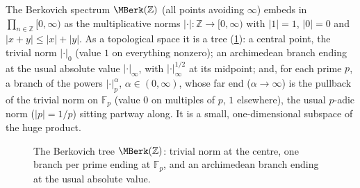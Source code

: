 \begin{remark}
\label{rmk:22:MZ}
The Berkovich spectrum $\MBerk(\mathbb Z)$ (all points avoiding $\infty$)
embeds in $\prod_{n\in\mathbb Z}[0,\infty)$ as the multiplicative norms
$|\cdot|\colon\mathbb Z\to[0,\infty)$ with $|1|=1$, $|0|=0$ and $|x+y|\le
|x|+|y|$. As a topological space it is a tree
(\cref{fig:22:MZ}): a central point, the trivial norm $|\cdot|_0$ (value $1$ on
everything nonzero); an archimedean branch ending at the usual absolute value
$|\cdot|_\infty$, with $|\cdot|_\infty^{1/2}$ at its midpoint; and, for each
prime $p$, a branch of the powers $|\cdot|_p^{\alpha}$, $\alpha\in(0,\infty)$,
whose far end ($\alpha\to\infty$) is the pullback of the trivial norm on
$\mathbb F_p$ (value $0$ on multiples of $p$, $1$ elsewhere), the usual
$p$-adic norm ($|p|=1/p$) sitting partway along. It is a small,
one-dimensional subspace of the huge product.
\end{remark}

\begin{figure}[ht]
\centering
{}
\caption{The Berkovich tree $\MBerk(\mathbb Z)$: trivial norm at the centre, one
branch per prime ending at $\mathbb F_p$, and an archimedean branch ending at
the usual absolute value.}
\label{fig:22:MZ}
\end{figure}

